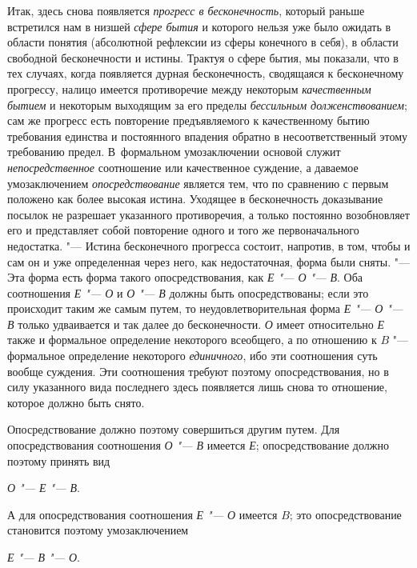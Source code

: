 Итак, здесь снова появляется
{\em прогресс в бесконечность},
который раньше встретился нам в низшей
{\em сфере бытия} и
которого нельзя уже было ожидать в области понятия (абсолютной рефлексии из
сферы конечного в себя), в области свободной бесконечности и истины.
Трактуя о сфере бытия, мы показали, что в тех случаях, когда появляется
дурная бесконечность, сводящаяся к бесконечному прогрессу, налицо имеется
противоречие между некоторым
{\em качественным бытием}
и некоторым выходящим за его пределы
{\em бессильным долженствованием};
сам же прогресс есть повторение предъявляемого к
качественному бытию требования единства и постоянного впадения обратно в
несоответственный этому требованию предел. В~формальном умозаключении
основой служит {\em непосредственное}
соотношение или качественное суждение, а даваемое
умозаключением {\em опосредствование}
является тем, что по сравнению с первым положено как более
высокая истина. Уходящее в бесконечность доказывание посылок не разрешает
указанного противоречия, а только постоянно возобновляет его и представляет
собой повторение одного и того же первоначального недостатка. "---
Истина бесконечного прогресса состоит, напротив, в том, чтобы
и сам он и уже определенная через него, как недостаточная, форма были
сняты. "--- Эта форма есть форма такого опосредствования, как
{\em Е "--- О "--- В}. Оба соотношения {\em Е "--- О} и {\em О
"--- В} должны быть опосредствованы; если это
происходит таким же самым путем, то неудовлетворительная форма {\em Е "--- О
"--- В} только удваивается и так далее до
бесконечности. {\em О} имеет относительно {\em Е} также и
формальное определение некоторого всеобщего, а по отношению к
$B$ "--- формальное определение некоторого
{\em единичного}, ибо эти
соотношения суть вообще суждения. Эти соотношения требуют поэтому
опосредствования, но в силу указанного вида последнего здесь появляется
лишь снова то отношение, которое должно быть снято.

Опосредствование должно поэтому совершиться другим путем. Для
опосредствования соотношения {\em О "--- В} имеется
{\em Е}; опосредствование должно поэтому принять вид

{\centering
{\em О "--- Е
"--- В}.
\par}

А для опосредствования соотношения {\em Е "--- О}
имеется $B$; это опосредствование становится поэтому умозаключением

{\centering
{\em Е "--- В
"--- О}.
\par}


